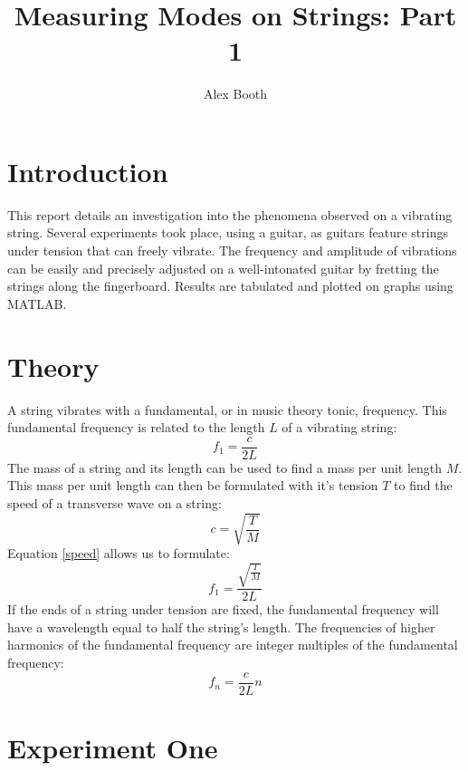 \documentclass[12pt]{article}
\title{Measuring Modes on Strings: Part 1}
\author{Alex Booth}
\begin{document}
    \maketitle

    \section{Introduction}
        This report details an investigation into the phenomena observed on a vibrating string.
        Several experiments took place, using a guitar, as guitars feature strings under tension that can freely vibrate.
        The frequency and amplitude of vibrations can be easily and precisely adjusted on a well-intonated guitar by fretting the strings along the fingerboard.
        Results are tabulated and plotted on graphs using MATLAB. 
    
    \section{Theory}
        A string vibrates with a fundamental, or in music theory tonic, frequency.
        This fundamental frequency is related to the length $L$ of a vibrating string:
        \begin{equation}
            f_1 = \frac{c}{2 L}
        \end{equation}
        The mass of a string and its length can be used to find a mass per unit length $M$.
        This mass per unit length can then be formulated with it's tension $T$ to find the speed of a transverse wave on a string:
        \begin{equation}\label{speed}
            c = \sqrt{\frac{T}{M}}
        \end{equation}
        Equation \ref{speed} allows us to formulate:
        \begin{equation}
            f_1 = \frac{\sqrt{\frac{T}{M}}}{2 L}
        \end{equation}
        If the ends of a string under tension are fixed, the fundamental frequency will have a wavelength equal to half the string's length.
        The frequencies of higher harmonics of the fundamental frequency are integer multiples of the fundamental frequency:
        \begin{equation}\label{harm}
            f_n = \frac{c}{2 L} n
        \end{equation}

    \section{Experiment One}
\end{document}
